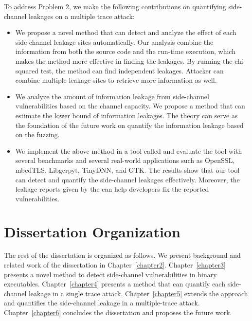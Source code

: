 To address Problem 2, we make the following contributions on quantifying side-channel leakages on a multiple trace attack:
\begin{itemize}
    \item We propose a novel method that can detect and analyze the effect of each side-channel leakage sites automatically. Our analysis combine the information from both the source code and the run-time execution, which makes the method more effective in finding the leakages. By running the chi-squared test, the method can find independent leakages. Attacker can combine multiple leakage sites to retrieve more information as well.
    \item We analyze the amount of information leakage from side-channel vulnerabilities based on the channel capacity. We propose a method that can estimate the lower bound of information leakages. The theory can serve as the foundation of the future work on quantify the information leakage based on the fuzzing.
    \item We implement the above method in a tool called \ctool{} and evaluate the tool with several benchmarks and several real-world applications such as OpenSSL, mbedTLS, Libgcrpyt, TinyDNN, and GTK. The results show that our tool can detect and quantify the side-channel leakages effectively. Moreover, the leakage reports given by the \ctool{} can help developers fix the reported vulnerabilities.
\end{itemize}


\section{Dissertation Organization}
The rest of the dissertation is organized as follows. We present background and related work of the dissertation in Chapter~\ref{chapter2}. Chapter~\ref{chapter3} presents a novel method to detect side-channel vulnerabilities in binary executables. Chapter~\ref{chapter4} presents a method that can quantify each side-channel leakage in a single trace attack. Chapter~\ref{chapter5} extends the approach and quantifies the side-channel leakage in a multiple-trace attack. Chapter~\ref{chapter6} concludes the dissertation and proposes the future work.